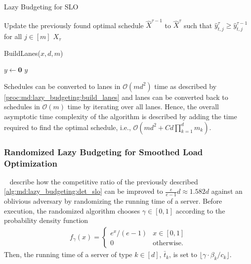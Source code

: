 \begin{algorithm}
    \caption{Lazy Budgeting for SLO~\cite{Albers2021}}\label{alg:md:lazy_budgeting:det_slo}
    Update the previously found optimal schedule $\hat{X}^{\tau-1}$ to $\hat{X}^{\tau}$ such that $\hat{y}_{t,j}^{\tau} \geq \hat{y}_{t,j}^{\tau-1}$ for all  $j \in [m]$\;
    \Return $X_{\tau}$\;
\end{algorithm}

\begin{function}
	\caption{BuildLanes($x, d, m$)}\label{proc:md:lazy_budgeting:build_lanes}
	$y \gets \mathbf{0}$\;
    \Return $y$\;
\end{function}

Schedules can be converted to lanes in $\mathcal{O}(m d^2)$ time as described by \ref{proc:md:lazy_budgeting:build_lanes} and lanes can be converted back to schedules in $\mathcal{O}(m)$ time by iterating over all lanes. Hence, the overall asymptotic time complexity of the algorithm is described by adding the time required to find the optimal schedule, i.e., $\mathcal{O}(m d^2 + C d \prod_{k=1}^d m_k)$.

\subsubsection{Randomized Lazy Budgeting for Smoothed Load Optimization}

\citeauthor*{Albers2021}~\cite{Albers2021} describe how the competitive ratio of the previously described \cref{alg:md:lazy_budgeting:det_slo} can be improved to $\frac{e}{e-1}d \approx 1.582d$ against an oblivious adversary by randomizing the running time of a server. Before execution, the randomized algorithm chooses $\gamma \in [0,1]$ according to the probability density function \begin{align*}
    f_{\gamma}(x) = \begin{cases}
        e^x / (e-1) & x \in [0,1] \\
        0 & \text{otherwise}.
    \end{cases}
\end{align*} Then, the running time of a server of type $k \in [d]$, $\bar{t}_k$, is set to $\lfloor \gamma \cdot \beta_k / c_k \rfloor$.

